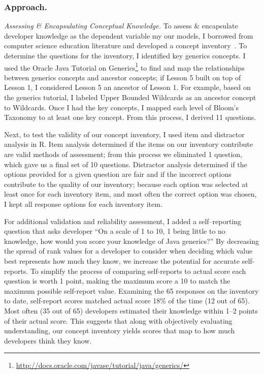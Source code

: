\documentclass{llncs}
\begin{document}
\subsubsection{Approach.}
\vspace{0.5em}
\noindent\textit{Assessing \& Encapsulating Conceptual Knowledge.}
To assess \& encapsulate developer knowledge as the dependent variable my our models, I borrowed from computer science education literature and developed a concept inventory~\cite{tew2010assessing}. 
To determine the questions for the inventory, I identified key generics concepts. I used the Oracle Java Tutorial on Generics\footnote{\url{http://docs.oracle.com/javase/tutorial/java/generics/}} to find and map the relationships between generics concepts and ancestor concepts; if Lesson 5 built on top of Lesson 1, I considered Lesson 5 an ancestor of Lesson 1. For example, based on the generics tutorial, I labeled Upper Bounded Wildcards as an ancestor concept to Wildcards. Once I had the key concepts, I mapped each level of Bloom's Taxonomy to at least one key concept. From this process, I derived 11 questions.

Next, to test the validity of our concept inventory, I used item and distractor analysis in R. Item analysis determined if the items on our inventory contribute are valid methods of assessment; from this process we eliminated 1 question, which gave us a final set of 10 questions.  Distractor analysis determined if the options provided for a given question are fair and if the incorrect options contribute to the quality of our inventory; because each option was selected at least once for each inventory item, and most often the correct option was chosen, I kept all response options for each inventory item.

For additional validation and reliability assessment, I added a self--reporting question that asks developer ``On a scale of 1 to 10, 1 being little to no knowledge, how would you score your knowledge of Java generics?'' 
By decreasing the spread of rank values for a developer to consider when deciding which value best represents how much they know, we increase the potential for accurate self-reports. To simplify the process of comparing self-reports to actual score each question is worth 1 point, making the maximum score a 10 to match the maximum possible self-report value. 
Examining the 65 responses on the inventory to date, self-report scores matched actual score 18\% of the time (12 out of 65). Most often (35 out of 65) developers estimated their knowledge within 1--2 points of their actual score. This suggests that along with objectively evaluating understanding, our concept inventory yields scores that map to how much developers think they know.
\end{document}
